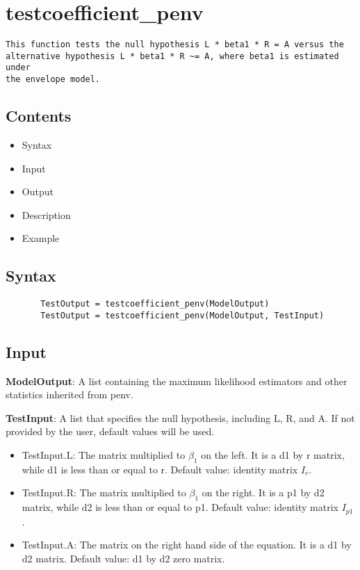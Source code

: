 \documentclass[a4paper,11pt,openany]{memoir}
\begin{document}
\newpage

\rmfamily
\color{black}\section{testcoefficient\_penv}


\begin{verbatim}This function tests the null hypothesis L * beta1 * R = A versus the
alternative hypothesis L * beta1 * R ~= A, where beta1 is estimated under
the envelope model.\end{verbatim}
    
\subsection*{Contents}

\begin{itemize}
\setlength{\itemsep}{-1ex}
   \item Syntax
   \item Input
   \item Output
   \item Description
   \item Example
\end{itemize}


\subsection*{Syntax}


\begin{verbatim}       TestOutput = testcoefficient_penv(ModelOutput)
       TestOutput = testcoefficient_penv(ModelOutput, TestInput)\end{verbatim}
    

\subsection*{Input}

\begin{par}
\textbf{ModelOutput}: A list containing the maximum likelihood estimators and other statistics inherited from penv.
\end{par} \vspace{1em}
\begin{par}
\textbf{TestInput}: A list that specifies the null hypothesis, including L, R, and A.  If not provided by the user, default values will be used.
\end{par} \vspace{1em}
\begin{itemize}
\setlength{\itemsep}{-1ex}
   \item TestInput.L: The matrix multiplied to $\beta_1$ on the left.  It is a d1 by r matrix, while d1 is less than or equal to r.  Default value: identity matrix $I_r$.
   \item TestInput.R: The matrix multiplied to $\beta_1$ on the right.  It is a p1 by d2 matrix, while d2 is less than or equal to p1.  Default value: identity matrix $I_{p1}$.
   \item TestInput.A: The matrix on the right hand side of the equation.  It is a d1 by d2 matrix.  Default value: d1 by d2 zero matrix.
\end{itemize}
\end{document}
